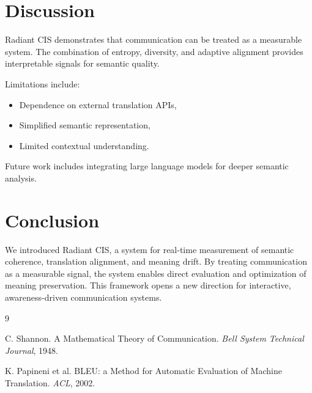 \documentclass{article}
\begin{document}
\section{Discussion}

Radiant CIS demonstrates that communication can be treated as a measurable system. The combination of entropy, diversity, and adaptive alignment provides interpretable signals for semantic quality.

Limitations include:
\begin{itemize}[noitemsep]
    \item Dependence on external translation APIs,
    \item Simplified semantic representation,
    \item Limited contextual understanding.
\end{itemize}

Future work includes integrating large language models for deeper semantic analysis.

\section{Conclusion}

We introduced Radiant CIS, a system for real-time measurement of semantic coherence, translation alignment, and meaning drift. By treating communication as a measurable signal, the system enables direct evaluation and optimization of meaning preservation. This framework opens a new direction for interactive, awareness-driven communication systems.

\begin{thebibliography}{9}

C. Shannon.
\newblock A Mathematical Theory of Communication.
\newblock \emph{Bell System Technical Journal}, 1948.

K. Papineni et al.
\newblock BLEU: a Method for Automatic Evaluation of Machine Translation.
\newblock \emph{ACL}, 2002.

\end{thebibliography}
\end{document}
